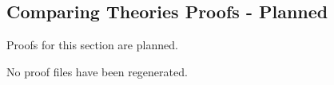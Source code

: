 \subsection*{Comparing Theories Proofs - Planned}

Proofs for this section are planned.

No proof files have been regenerated.
